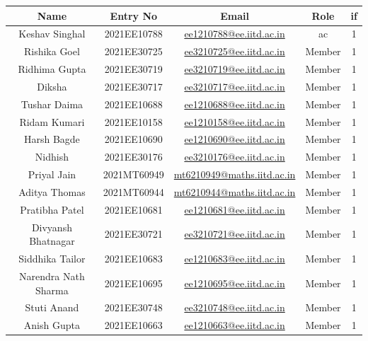 \documentclass[12pt]{article} %
\begin{document}
\begin{table}[h!]
\centering
\begin{tabular}{|c|c|c|c|c|}
\hline
Name & Entry No & Email & Role & \acrshort{if} \\
\hline
Keshav Singhal & 2021EE10788 & \href{mailto:ee1210788@ee.iitd.ac.in}{ee1210788@ee.iitd.ac.in} & \acrshort{ac} & 1 \\
Rishika Goel & 2021EE30725 & \href{mailto:ee3210725@ee.iitd.ac.in}{ee3210725@ee.iitd.ac.in} & Member & 1 \\
Ridhima Gupta & 2021EE30719 & \href{mailto:ee3210719@ee.iitd.ac.in}{ee3210719@ee.iitd.ac.in} & Member & 1 \\
Diksha & 2021EE30717 & \href{mailto:ee3210717@ee.iitd.ac.in}{ee3210717@ee.iitd.ac.in} & Member & 1 \\
Tushar Daima & 2021EE10688 & \href{mailto:ee1210688@ee.iitd.ac.in}{ee1210688@ee.iitd.ac.in} & Member & 1 \\
Ridam Kumari & 2021EE10158 & \href{mailto:ee1210158@ee.iitd.ac.in}{ee1210158@ee.iitd.ac.in} & Member & 1 \\
Harsh Bagde & 2021EE10690 & \href{mailto:ee1210690@ee.iitd.ac.in}{ee1210690@ee.iitd.ac.in} & Member & 1 \\
Nidhish & 2021EE30176 & \href{mailto:ee3210176@ee.iitd.ac.in}{ee3210176@ee.iitd.ac.in} & Member & 1 \\
Priyal Jain & 2021MT60949 & \href{mailto:mt6210949@maths.iitd.ac.in}{mt6210949@maths.iitd.ac.in} & Member & 1 \\
Aditya Thomas & 2021MT60944 & \href{mailto:mt6210944@maths.iitd.ac.in}{mt6210944@maths.iitd.ac.in} & Member & 1 \\
Pratibha Patel & 2021EE10681 & \href{mailto:ee1210681@ee.iitd.ac.in}{ee1210681@ee.iitd.ac.in} & Member & 1 \\
Divyansh Bhatnagar & 2021EE30721 & \href{mailto:ee3210721@ee.iitd.ac.in}{ee3210721@ee.iitd.ac.in} & Member & 1 \\
Siddhika Tailor & 2021EE10683 & \href{mailto:ee1210683@ee.iitd.ac.in}{ee1210683@ee.iitd.ac.in} & Member & 1 \\
Narendra Nath Sharma & 2021EE10695 & \href{mailto:ee1210695@ee.iitd.ac.in}{ee1210695@ee.iitd.ac.in} & Member & 1 \\
Stuti Anand & 2021EE30748 & \href{mailto:ee3210748@ee.iitd.ac.in}{ee3210748@ee.iitd.ac.in} & Member & 1 \\
Anish Gupta & 2021EE10663 & \href{mailto:ee1210663@ee.iitd.ac.in}{ee1210663@ee.iitd.ac.in} & Member & 1 \\

\end{tabular}
\end{table}
\end{document}
